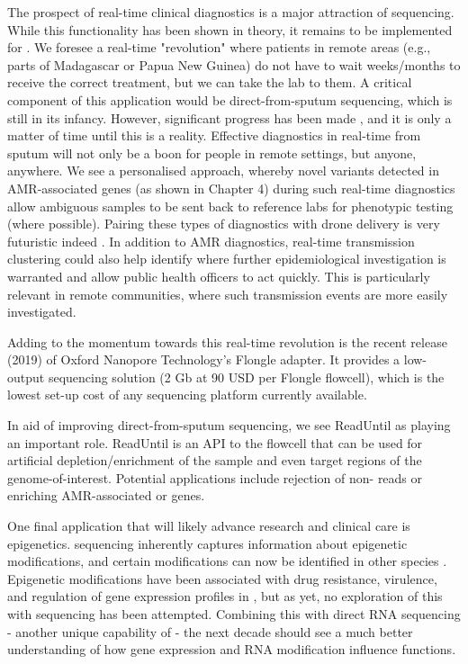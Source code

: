 The prospect of real-time clinical diagnostics is a major attraction of \ont{} sequencing. While this functionality has been shown in theory, it remains to be implemented for \mtb{}. We foresee a real-time "revolution" where patients in remote areas (e.g., parts of Madagascar or Papua New Guinea) do not have to wait weeks/months to receive the correct treatment, but we can take the lab to them. A critical component of this application would be direct-from-sputum \ont{} sequencing, which is still in its infancy. However, significant progress has been made \cite{George2020,Votintseva2017}, and it is only a matter of time until this is a reality. Effective diagnostics in real-time from sputum will not only be a boon for people in remote settings, but anyone, anywhere. We see a personalised approach, whereby novel variants detected in AMR-associated genes (as shown in Chapter 4) during such real-time diagnostics allow ambiguous samples to be sent back to reference labs for phenotypic testing (where possible). Pairing these types of diagnostics with drone delivery is very futuristic indeed \cite{Bahrainwala2020}. In addition to AMR diagnostics, real-time transmission clustering could also help identify where further epidemiological investigation is warranted and allow public health officers to act quickly. This is particularly relevant in remote communities, where such transmission events are more easily investigated. 

Adding to the momentum towards this real-time revolution is the recent release (2019) of Oxford Nanopore Technology's Flongle adapter. It provides a low-output sequencing solution (2 Gb at 90 USD per Flongle flowcell), which is the lowest set-up cost of any sequencing platform currently available. 

In aid of improving direct-from-sputum sequencing, we see ReadUntil \cite{Payne2021,Kovaka2021} as playing an important role. ReadUntil is an API to the flowcell that can be used for artificial depletion/enrichment of the sample and even target regions of the genome-of-interest. Potential applications include rejection of non-\mtb{} reads or enriching AMR-associated or \ppe{} genes.

One final application that will likely advance \mtb{} research and clinical care is epigenetics. \ont{} sequencing inherently captures information about epigenetic modifications, and certain modifications can now be identified in other species \cite{Furlan2021}. Epigenetic modifications have been associated with drug resistance, virulence, and regulation of gene expression profiles in \mtb{} \cite{Phelan2018Methylation,Shell2013,Zhu2016Precision}, but as yet, no exploration of this with \ont{} sequencing has been attempted. Combining this with direct RNA sequencing - another unique capability of \ont{} - the next decade should see a much better understanding of how gene expression and RNA modification influence \mtb{} functions.
